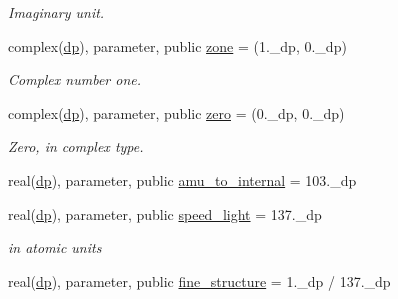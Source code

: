 \begin{DoxyCompactItemize}
\begin{DoxyCompactList}\small\item\em Imaginary unit. \end{DoxyCompactList}\item 
\mbox{\label{namespaceconstants__pop_a8edc7d38939b111c254324349ea23a4e}} 
complex(\mbox{\hyperlink{namespaceconstants__pop_aa40e688cf9ef9b7cf0db05c80879ca15}{dp}}), parameter, public \mbox{\hyperlink{namespaceconstants__pop_a8edc7d38939b111c254324349ea23a4e}{zone}} = (1.\+\_\+dp, 0.\+\_\+dp)
\begin{DoxyCompactList}\small\item\em Complex number one. \end{DoxyCompactList}\item 
\mbox{\label{namespaceconstants__pop_aae6cdd4aab6006c82b6b6614d95804c1}} 
complex(\mbox{\hyperlink{namespaceconstants__pop_aa40e688cf9ef9b7cf0db05c80879ca15}{dp}}), parameter, public \mbox{\hyperlink{namespaceconstants__pop_aae6cdd4aab6006c82b6b6614d95804c1}{zero}} = (0.\+\_\+dp, 0.\+\_\+dp)
\begin{DoxyCompactList}\small\item\em Zero, in complex type. \end{DoxyCompactList}\item 
real(\mbox{\hyperlink{namespaceconstants__pop_aa40e688cf9ef9b7cf0db05c80879ca15}{dp}}), parameter, public \mbox{\hyperlink{namespaceconstants__pop_a65af0ef41eb6207bbb00ff634e46aead}{amu\+\_\+to\+\_\+internal}} = 103.\+\_\+dp
\item 
\mbox{\label{namespaceconstants__pop_ab04ab54f96ed6fef633748a530e9185a}} 
real(\mbox{\hyperlink{namespaceconstants__pop_aa40e688cf9ef9b7cf0db05c80879ca15}{dp}}), parameter, public \mbox{\hyperlink{namespaceconstants__pop_ab04ab54f96ed6fef633748a530e9185a}{speed\+\_\+light}} = 137.\+\_\+dp
\begin{DoxyCompactList}\small\item\em in atomic units \end{DoxyCompactList}\item 
\mbox{\label{namespaceconstants__pop_a1f85092be6cafe4f853150042e429521}} 
real(\mbox{\hyperlink{namespaceconstants__pop_aa40e688cf9ef9b7cf0db05c80879ca15}{dp}}), parameter, public \mbox{\hyperlink{namespaceconstants__pop_a1f85092be6cafe4f853150042e429521}{fine\+\_\+structure}} = 1.\+\_\+dp / 137.\+\_\+dp

\end{DoxyCompactItemize}
